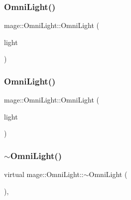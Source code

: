 \hypertarget{classmage_1_1_omni_light_a090be5e95e1c3d6c43e80ad7fae10794}{}\label{classmage_1_1_omni_light_a090be5e95e1c3d6c43e80ad7fae10794} 
\subsubsection{\texorpdfstring{Omni\+Light()}{OmniLight()}\hspace{0.1cm}{\footnotesize\ttfamily [2/3]}}
{\footnotesize\ttfamily mage\+::\+Omni\+Light\+::\+Omni\+Light (\begin{DoxyParamCaption}\item[{const \hyperlink{classmage_1_1_omni_light}{Omni\+Light} \&}]{light }\end{DoxyParamCaption})\hspace{0.3cm}{\ttfamily [default]}}

\hypertarget{classmage_1_1_omni_light_ae844308b4199f9c75c38512e8d8ad5e7}{}\label{classmage_1_1_omni_light_ae844308b4199f9c75c38512e8d8ad5e7} 
\subsubsection{\texorpdfstring{Omni\+Light()}{OmniLight()}\hspace{0.1cm}{\footnotesize\ttfamily [3/3]}}
{\footnotesize\ttfamily mage\+::\+Omni\+Light\+::\+Omni\+Light (\begin{DoxyParamCaption}\item[{\hyperlink{classmage_1_1_omni_light}{Omni\+Light} \&\&}]{light }\end{DoxyParamCaption})\hspace{0.3cm}{\ttfamily [default]}}

\hypertarget{classmage_1_1_omni_light_a9a741cc7e5e11d386c7a032df2d231a3}{}\label{classmage_1_1_omni_light_a9a741cc7e5e11d386c7a032df2d231a3} 
\subsubsection{\texorpdfstring{$\sim$\+Omni\+Light()}{~OmniLight()}}
{\footnotesize\ttfamily virtual mage\+::\+Omni\+Light\+::$\sim$\+Omni\+Light (\begin{DoxyParamCaption}{ }\end{DoxyParamCaption})\hspace{0.3cm}{\ttfamily [virtual]}, {\ttfamily [default]}}



